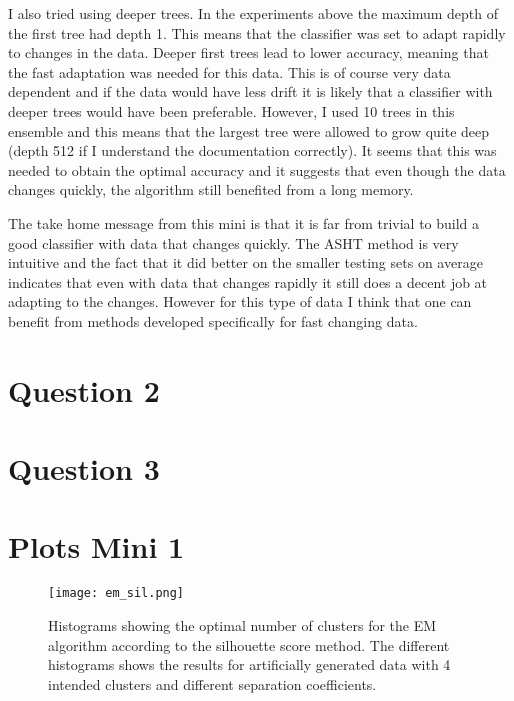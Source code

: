\documentclass[11pt,twoside,swedish]{article}
\begin{document}
I also tried using deeper trees. In the experiments above the maximum
depth of the first tree had depth 1. This means that the classifier
was set to adapt rapidly to changes in the data. Deeper first trees
lead to lower accuracy, meaning that the fast adaptation was needed
for this data. This is of course very data dependent and if the data
would have less drift it is likely that a classifier with deeper trees
would have been preferable. However, I used 10 trees in this ensemble
and this means that the largest tree were allowed to grow quite deep
(depth 512 if I understand the documentation correctly). It seems that
this was needed to obtain the optimal accuracy and it suggests that
even though the data changes quickly, the algorithm still benefited
from a long memory.

The take home message from this mini is that it is far from trivial to
build a good classifier with data that changes quickly. The ASHT
method is very intuitive and the fact that it did better on the
smaller testing sets on average indicates that even with data that
changes rapidly it still does a decent job at adapting to the
changes. However for this type of data I think that one can benefit
from methods developed specifically for fast changing data.  




\section{Question 2}\label{Question 2}

\section{Question 3}\label{Question 3}

\newpage
\appendix

\section{Plots Mini 1}\label{Plots Mini 1}

\graphicspath{{/home/mikael/Repos/Courses/msa220/Mini/Mini/Mini_1/new_plots/}}
\begin{figure}[!htb]
\begin{center}
\texttt{[image: em\_sil.png]}
\caption{Histograms showing the optimal number of clusters for the EM
  algorithm according to the silhouette score method. The different
  histograms shows the results for artificially generated data with 4
  intended clusters and different separation coefficients.}
\label{em_sil_hists}
\end{center}
\end{figure}
\end{document}
